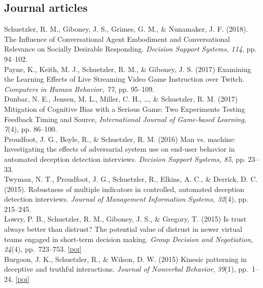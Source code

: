 \documentclass[10pt, letter]{article}
\newcommand{\doi}[1]{\href{#1}{\scriptsize\textsc{[doi]}}}
\newcommand{\years}[1]{\marginnote{\scriptsize #1}}
\begin{document}
\subsection*{Journal articles}
\noindent
\years{2018} Schuetzler, R. M., Giboney, J. S., Grimes, G. M., \& Nunamaker, J. F. (2018).
The Influence of Conversational Agent Embodiment and Conversational Relevance on Socially Desirable Responding.
\emph{Decision Support Systems, 114}, pp. 94--102.\\

\years{2017} Payne, K., Keith, M. J., Schuetzler, R. M., \& Giboney, J. S. (2017)
Examining the Learning Effects of Live Streaming Video Game Instruction over
Twitch. \emph{Computers in Human Behavior, 77}, pp. 95--109.\\

\years{} Dunbar, N. E., Jensen, M. L., Miller, C. H., \ldots{}, \& Schuetzler,
R. M. (2017) Mitigation of Cognitive Bias with a Serious Game: Two Experiments
Testing Feedback Timing and Source, \emph{International Journal of Game-based
  Learning, 7}(4), pp. 86--100.\\

\years{2016} Proudfoot, J. G., Boyle, R., \& Schuetzler, R. M. (2016) Man
vs. machine: Investigating the effects of adversarial system use on end-user
behavior in automated deception detection interviews. \emph{Decision Support
  Systems, 85}, pp. 23--33.\\

\years{2015} Twyman, N. T., Proudfoot, J. G., Schuetzler, R., Elkins,
A. C., \& Derrick, D. C. (2015). Robustness of multiple indicators in
controlled, automated deception detection interviews. \emph{Journal of
  Management Information Systems, 32}(4), pp. 215--245.\\

\years{}Lowry, P. B., Schuetzler, R. M., Giboney, J. S., \& Gregory, T. (2015) Is
trust always better than distrust? The potential value of distrust in newer virtual teams
engaged in short-term decision making. \emph{Group Decision and
  Negotiation}, \emph{24}(4), pp.\ 723--753. \doi{http://dx.doi.org/10.1007/s10726-014-9410-x}\\

\years{}Burgoon, J. K., Schuetzler, R., \& Wilson, D. W. (2015) Kinesic patterning in
deceptive and truthful interactions.  \emph{Journal of Nonverbal Behavior}, \emph{39}(1), pp.\ 1--24. \doi{http://dx.doi.org/10.1007/s10919-014-0190-4}\\
\end{document}
